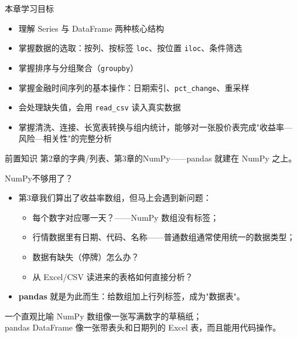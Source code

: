 \documentclass[9pt]{ctexbeamer}
\begin{document}
\begin{frame}{本章学习目标}
	\begin{itemize}
		\item 理解 Series 与 DataFrame 两种核心结构
		\item 掌握数据的选取：按列、按标签 \texttt{loc}、按位置 \texttt{iloc}、条件筛选
		\item 掌握排序与分组聚合（\texttt{groupby}）
		\item 掌握金融时间序列的基本操作：日期索引、\texttt{pct\_change}、重采样
		\item 会处理缺失值，会用 \texttt{read\_csv} 读入真实数据
		\item 掌握清洗、连接、长宽表转换与组内统计，能够对一张股价表完成"收益率—风险—相关性"的完整分析
	\end{itemize}
	\begin{block}{前置知识}
		第2章的字典/列表、第3章的NumPy——pandas 就建在 NumPy 之上。
	\end{block}
\end{frame}

\begin{frame}{NumPy不够用了？}
	\begin{itemize}
		\item 第3章我们算出了收益率数组，但马上会遇到新问题：
		\begin{itemize}
			\item 每个数字对应\alert{哪一天}？——NumPy 数组没有标签；
			\item 行情数据里有日期、代码、名称——普通数组通常使用统一的数据类型；
			\item 数据有\alert{缺失}（停牌）怎么办？
			\item 从 Excel/CSV 读进来的表格如何直接分析？
		\end{itemize}
		\item \textbf{pandas} 就是为此而生：给数组加上行列标签，成为"数据表"。
	\end{itemize}
	\begin{exampleblock}{一个直观比喻}
		NumPy 数组像一张写满数字的草稿纸；\\
		pandas DataFrame 像一张\alert{带表头和日期列的 Excel 表}，而且能用代码操作。
	\end{exampleblock}
\end{frame}
\end{document}
